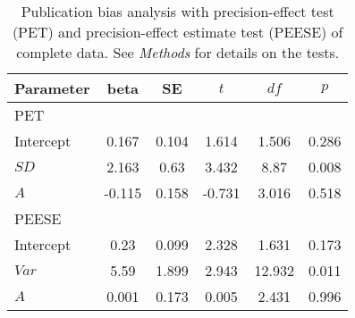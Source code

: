 \begin{table}[ht]
\centering
\caption{Publication bias analysis with precision-effect test (PET) and precision-effect estimate test (PEESE) of complete data. See \textit{Methods} for details on the tests.} 
\label{tab:PET-PEESE}
\begin{tabular}{lccccc}
  \hline
Parameter & beta & SE & $t$ & $df$ & $p$ \\ 
  \hline
PET &  &  &  &  &  \\ 
  Intercept & 0.167 & 0.104 & 1.614 & 1.506 & 0.286 \\ 
  $SD$ & 2.163 & 0.63 & 3.432 & 8.87 & 0.008 \\ 
  $A$ & -0.115 & 0.158 & -0.731 & 3.016 & 0.518 \\ 
  PEESE &  &  &  &  &  \\ 
  Intercept & 0.23 & 0.099 & 2.328 & 1.631 & 0.173 \\ 
  $Var$ & 5.59 & 1.899 & 2.943 & 12.932 & 0.011 \\ 
  $A$ & 0.001 & 0.173 & 0.005 & 2.431 & 0.996 \\ 
   \hline
\end{tabular}
\end{table}

